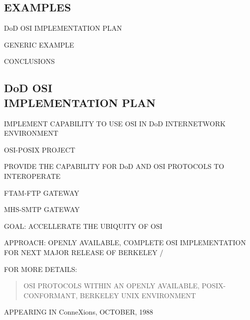 \begin{bwslide}
\part	{EXAMPLES}\bf

\begin{nrtc}
\item	DoD OSI IMPLEMENTATION PLAN

\item	GENERIC EXAMPLE

\item	CONCLUSIONS
\end{nrtc}
\end{bwslide}


\begin{bwslide}
\part*	{DoD OSI\\ IMPLEMENTATION PLAN}\bf

\begin{nrtc}
\item	IMPLEMENT CAPABILITY TO USE OSI IN DoD INTERNETWORK ENVIRONMENT
    \begin{nrtc}
    \item	OSI-POSIX PROJECT
    \end{nrtc}

\item	PROVIDE THE CAPABILITY FOR DoD AND OSI PROTOCOLS TO INTEROPERATE
    \begin{nrtc}
    \item	FTAM-FTP GATEWAY

    \item	MHS-SMTP GATEWAY
    \end{nrtc}
\end{nrtc}
\end{bwslide}


\begin{bwslide}

\begin{nrtc}
\item	GOAL: ACCELLERATE THE UBIQUITY OF OSI

\item	APPROACH: OPENLY AVAILABLE, COMPLETE OSI IMPLEMENTATION FOR NEXT MAJOR
	RELEASE OF BERKELEY \unix/

\item	FOR MORE DETAILS:
\begin{quote}
OSI PROTOCOLS WITHIN AN OPENLY AVAILABLE, POSIX-CONFORMANT, BERKELEY UNIX
ENVIRONMENT
\end{quote}
APPEARING IN ConneXions, OCTOBER, 1988
\end{nrtc}
\end{bwslide}


